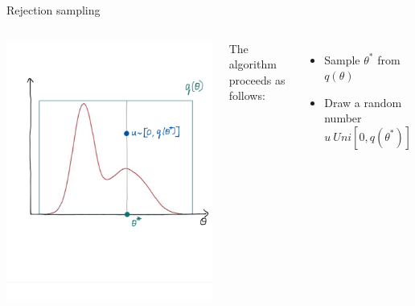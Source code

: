\documentclass[compress]{beamer}
\begin{document}
\begin{frame}[label=sec-5-5]{Rejection sampling}
\begin{columns}[c] 
\includegraphics[width=.8\linewidth]{RS4.png}

The algorithm proceeds as follows:\\
\begin{itemize}
\item Sample $\theta^*$ from $q(\theta)$
\item Draw a random number $u ~ Uni[0, q(\theta^*)]$
\end{itemize}
\end{columns}
\end{frame}
\end{document}
